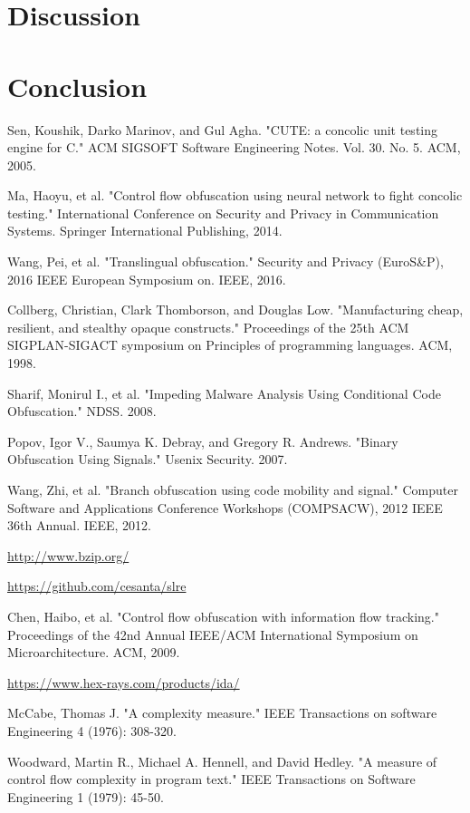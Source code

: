 \documentclass[lnicst]{svmultln}
\begin{document}
\section{Discussion}
\section{Conclusion}

%
%
\begin{thebibliography}{5}

 Sen, Koushik, Darko Marinov, and Gul Agha. "CUTE: a concolic unit testing engine for C." ACM SIGSOFT Software Engineering Notes. Vol. 30. No. 5. ACM, 2005.

 Ma, Haoyu, et al. "Control flow obfuscation using neural network to fight concolic testing." International Conference on Security and Privacy in Communication Systems. Springer International Publishing, 2014.

 Wang, Pei, et al. "Translingual obfuscation." Security and Privacy (EuroS\&P), 2016 IEEE European Symposium on. IEEE, 2016.

 Collberg, Christian, Clark Thomborson, and Douglas Low. "Manufacturing cheap, resilient, and stealthy opaque constructs." Proceedings of the 25th ACM SIGPLAN-SIGACT symposium on Principles of programming languages. ACM, 1998.

 Sharif, Monirul I., et al. "Impeding Malware Analysis Using Conditional Code Obfuscation." NDSS. 2008.

 Popov, Igor V., Saumya K. Debray, and Gregory R. Andrews. "Binary Obfuscation Using Signals." Usenix Security. 2007.

 Wang, Zhi, et al. "Branch obfuscation using code mobility and signal." Computer Software and Applications Conference Workshops (COMPSACW), 2012 IEEE 36th Annual. IEEE, 2012.

 \url{http://www.bzip.org/}

 \url{https://github.com/cesanta/slre}

 Chen, Haibo, et al. "Control flow obfuscation with information flow tracking." Proceedings of the 42nd Annual IEEE/ACM International Symposium on Microarchitecture. ACM, 2009.

 \url{https://www.hex-rays.com/products/ida/}

 McCabe, Thomas J. "A complexity measure." IEEE Transactions on software Engineering 4 (1976): 308-320.

 Woodward, Martin R., Michael A. Hennell, and David Hedley. "A measure of control flow complexity in program text." IEEE Transactions on Software Engineering 1 (1979): 45-50.


\end{thebibliography}
%
\end{document}
